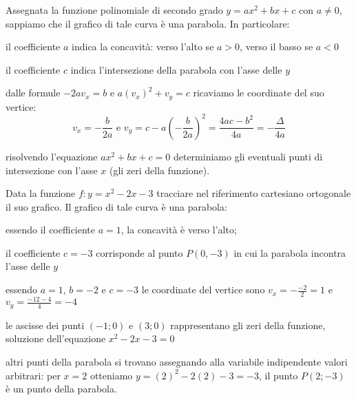 Assegnata la funzione polinomiale di secondo grado \(y={ax}^2+{bx}+c\) con 
\(a\neq 0\), sappiamo che il grafico di tale curva è una parabola. 
In particolare:
\begin{itemize*}
\item il coefficiente \(a\) indica la concavità: verso l'alto se \(a>0\), verso 
il 
basso se \(a<0\)
\item il coefficiente \(c\) indica l'intersezione della parabola con l'asse 
delle 
\(y\)
\item dalle formule \(-2av_x=b\) e \(a(v_x)^2+v_y=c\) ricaviamo le coordinate del 
suo vertice:
\[v_x=-\frac b{2a} \text{ e } 
  v_y=c-a\left(-\frac{b}{2a}\right)^2=\frac{4ac-b^2}{4a}=-\frac{\Delta }{4a}\]
\item risolvendo l'equazione \({ax}^2+{bx}+c=0\) determiniamo gli eventuali 
punti 
di intersezione con l'asse \(x\) (gli zeri della funzione).
\end{itemize*}

\begin{esempio}
Data la funzione \(f: y=x^2-2x-3\) tracciare nel riferimento cartesiano 
ortogonale 
il suo grafico.
Il grafico di tale curva è una parabola:
\begin{itemize*}
\item essendo il coefficiente \(a=1\), la concavità è verso l'alto;
\item il coefficiente \(c=-3\) corrisponde al punto \(P(0,-3)\) in cui la 
parabola 
incontra l'asse delle \(y\)
\item essendo \( a=1 \), \(b=-2\) e \(c=-3\) le coordinate del vertice sono 
\(v_x=-\frac{-2} 2=1\) e \(v_y=\frac{-12-4} 4=-4\)
\item le ascisse dei punti \((-1;0)\) e \((3;0)\) rappresentano gli zeri della 
funzione, soluzione dell'equazione \(x^2-2x-3=0\)
\item altri punti della parabola si trovano assegnando alla variabile 
indipendente valori arbitrari: per \(x=2\) otteniamo \(y=(2)^2-2(2)-3=-3\), il 
punto 
\(P(2;-3)\) è un punto della parabola.
\end{itemize*}

\begin{inaccessibleblock}
\begin{center}
  \parabola
\end{center}
\end{inaccessibleblock}

\end{esempio}

